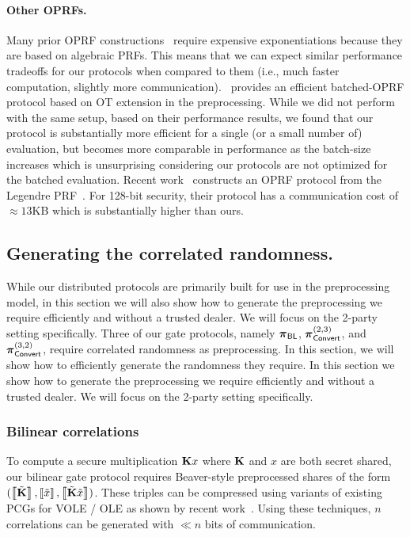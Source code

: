 \paragraph{Other OPRFs.}
Many prior OPRF constructions~\cite{freedman2005-oprf,jarecki2009-oprf} require expensive exponentiations because they are based on algebraic PRFs. This means that we can expect similar performance tradeoffs for our protocols when compared to them (i.e., much faster computation, slightly more communication).~\cite{kolesnikov2016-oprf} provides an efficient batched-OPRF protocol based on OT extension in the preprocessing. While we did not perform with the same setup, based on their performance results, we found that our protocol is substantially more efficient for a single (or a small number of) evaluation, but becomes more comparable in performance as the batch-size increases which is unsurprising considering our protocols are not optimized for the batched evaluation. Recent work~\cite{seres2021-legendre} constructs an OPRF protocol from the Legendre PRF~\cite{damgard1988-legendre}. For 128-bit security, their protocol has a communication cost of $\approx 13$KB which is substantially higher than ours.
\else
\fi

\subsection{Generating the correlated randomness.}
\label{subsec:preprocessing}
\iffull
While our distributed protocols are primarily built for use in the preprocessing model, in this section we will also show how to generate the preprocessing we require efficiently and without a trusted dealer. We will focus on the 2-party setting specifically. Three of our gate protocols, namely $\boldsymbol{\pi}_{\textnormal{\textsf{BL}}}$, $\boldsymbol{\pi}_{\textnormal{\textsf{Convert}}}^{(2,3)}$, and $\boldsymbol{\pi}_{\textnormal{\textsf{Convert}}}^{(3,2)}$, require correlated randomness as preprocessing. In this section, we will show how to efficiently generate the randomness they require.
\else
In this section we show how to generate the preprocessing we require efficiently and without a trusted dealer. We will focus on the 2-party setting specifically.
\fi

\iffull
\subsubsection{Bilinear correlations}
To compute a secure multiplication $\mat{K}x$ where $\mat{K}$ and $x$ are both secret shared, our bilinear gate protocol requires Beaver-style preprocessed shares of the form $(\share{\tilde{\mat{K}}}, \share{\tilde{x}}, \share{\tilde{\mat{K}}\tilde{x}})$. These triples can be compressed using variants of existing PCGs for VOLE / OLE as shown by recent work~\cite{boyle2019-pcg, boyle2020-lpn-pcg}. Using these techniques, $n$ correlations can be generated with $\ll n$ bits of communication.
\fi

